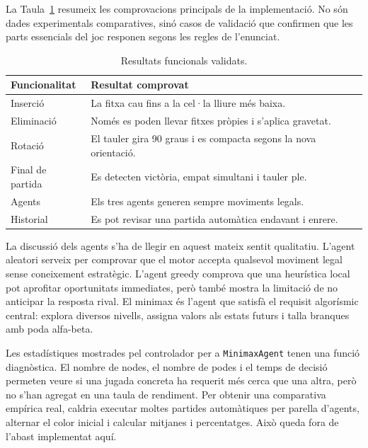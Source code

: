 \documentclass[conference,compsoc]{IEEEtran}
\begin{document}
La Taula~\ref{tab:functional-results} resumeix les comprovacions principals de la
implementació. No són dades experimentals comparatives, sinó casos de validació
que confirmen que les parts essencials del joc responen segons les regles de
l'enunciat.

\begin{table}[H]
\centering
\caption{Resultats funcionals validats.}
\label{tab:functional-results}
\begin{tabular}{p{}p{}}
\toprule
Funcionalitat & Resultat comprovat \\
\midrule
Inserció & La fitxa cau fins a la cel·la lliure més baixa. \\
Eliminació & Només es poden llevar fitxes pròpies i s'aplica gravetat. \\
Rotació & El tauler gira 90 graus i es compacta segons la nova orientació. \\
Final de partida & Es detecten victòria, empat simultani i tauler ple. \\
Agents & Els tres agents generen sempre moviments legals. \\
Historial & Es pot revisar una partida automàtica endavant i enrere. \\
\bottomrule
\end{tabular}
\end{table}

La discussió dels agents s'ha de llegir en aquest mateix sentit qualitatiu. L'agent
aleatori serveix per comprovar que el motor accepta qualsevol moviment legal sense
coneixement estratègic. L'agent greedy comprova que una heurística local pot
aprofitar oportunitats immediates, però també mostra la limitació de no anticipar
la resposta rival. El minimax és l'agent que satisfà el requisit algorísmic central:
explora diversos nivells, assigna valors als estats futurs i talla branques amb
poda alfa-beta.

Les estadístiques mostrades pel controlador per a \texttt{MinimaxAgent} tenen una
funció diagnòstica. El nombre de nodes, el nombre de podes i el temps de decisió
permeten veure si una jugada concreta ha requerit més cerca que una altra, però no
s'han agregat en una taula de rendiment. Per obtenir una comparativa empírica real,
caldria executar moltes partides automàtiques per parella d'agents, alternar el
color inicial i calcular mitjanes i percentatges. Això queda fora de l'abast
implementat aquí.

\end{document}
